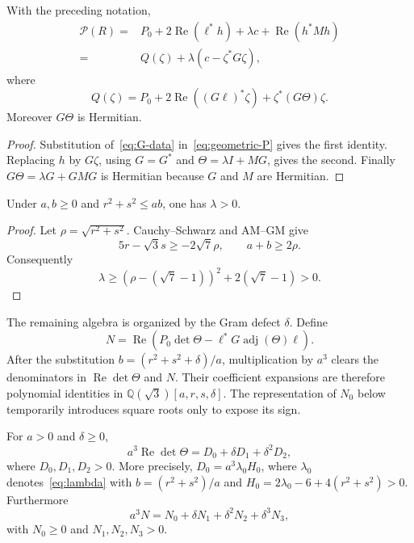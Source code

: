 \documentclass[10pt,twoside]{siamart1116}
\newcommand{\Rea}{\operatorname{Re}}
\newcommand{\adj}{\operatorname{adj}}
\begin{document}
\begin{lemma}\label{lem:quadratic-decomposition}
With the preceding notation,
\begin{align}
 \mathcal P(R)
 ={}&P_0+2\Rea(\ell^*h)+\lambda c+\Rea(h^*Mh)\label{eq:P-quadratic}\\
 ={}&Q(\zeta)+\lambda(c-\zeta^*G\zeta),\nonumber
\end{align}
where
\begin{equation}\label{eq:Qzeta}
 Q(\zeta)=P_0+2\Rea((G\ell)^*\zeta)+\zeta^*(G\Theta)\zeta.
\end{equation}
Moreover $G\Theta$ is Hermitian.
\end{lemma}

\begin{proof}
Substitution of~\eqref{eq:G-data} in~\eqref{eq:geometric-P} gives the first
identity.  Replacing $h$ by $G\zeta$, using $G=G^*$ and
$\Theta=\lambda I+MG$, gives the second.  Finally
$G\Theta=\lambda G+GMG$ is Hermitian because $G$ and $M$ are Hermitian.
\end{proof}

\begin{lemma}\label{lem:lambda-positive}
Under $a,b\geq0$ and $r^2+s^2\leq ab$, one has $\lambda>0$.
\end{lemma}

\begin{proof}
Let $\rho=\sqrt{r^2+s^2}$.  Cauchy--Schwarz and AM--GM give
\[
 5r-\sqrt3s\geq-2\sqrt7\rho,\qquad a+b\geq2\rho.
\]
Consequently
\[
 \lambda\geq(\rho-(\sqrt7-1))^2+2(\sqrt7-1)>0.
\]
\end{proof}

The remaining algebra is organized by the Gram defect $\delta$.  Define
\begin{equation}\label{eq:Ndef}
 N=\Rea\left(P_0\det\Theta-\ell^*G\adj(\Theta)\ell\right).
\end{equation}
After the substitution $b=(r^2+s^2+\delta)/a$, multiplication by $a^3$
clears the denominators in $\Rea\det\Theta$ and $N$.  Their coefficient
expansions are therefore polynomial identities in
$\mathbb Q(\sqrt3)[a,r,s,\delta]$.  The representation of $N_0$ below
temporarily introduces square roots only to expose its sign.

\begin{lemma}\label{lem:quadratic-certs}
For $a>0$ and $\delta\geq0$,
\begin{equation}\label{eq:detTheta-expansion}
 a^3\Rea\det\Theta=D_0+\delta D_1+\delta^2D_2,
\end{equation}
where $D_0,D_1,D_2>0$.  More precisely,
$D_0=a^3\lambda_0H_0$, where $\lambda_0$ denotes~\eqref{eq:lambda}
with $b=(r^2+s^2)/a$ and
$H_0=2\lambda_0-6+4(r^2+s^2)>0$.
Furthermore
\begin{equation}\label{eq:N-expansion}
 a^3N=N_0+\delta N_1+\delta^2N_2+\delta^3N_3,
\end{equation}
with $N_0\geq0$ and $N_1,N_2,N_3>0$.
\end{lemma}
\end{document}
